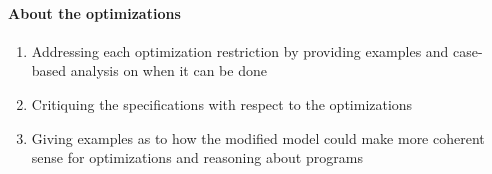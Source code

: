     \paragraph{About the optimizations}
    \begin{enumerate}
        \item Addressing each optimization restriction by providing examples and case-based analysis on when it can be done
        \item Critiquing the specifications with respect to the optimizations
        \item Giving examples as to how the modified model could make more coherent sense for optimizations and reasoning about programs
    \end{enumerate}